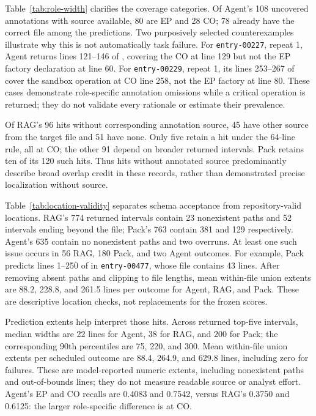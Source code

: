 


Table~\ref{tab:role-width} clarifies the coverage categories. Of Agent's 108 uncovered annotations with source available, 80 are EP and 28 CO; 78 already have the correct file among the predictions. Two purposively selected counterexamples illustrate why this is not automatically task failure. For \texttt{entry-00227}, repeat 1, Agent returns lines 121--146 of , covering the CO at line 129 but not the EP factory declaration at line 60. For \texttt{entry-00229}, repeat 1, its lines 253--267 of  cover the sandbox operation at CO line 258, not the EP factory at line 80. These cases demonstrate role-specific annotation omissions while a critical operation is returned; they do not validate every rationale or estimate their prevalence.

Of RAG's 96 hits without corresponding annotation source, 45 have other source from the target file and 51 have none. Only five retain a hit under the 64-line rule, all at CO; the other 91 depend on broader returned intervals. Pack retains ten of its 120 such hits. Thus hits without annotated source predominantly describe broad overlap credit in these records, rather than demonstrated precise localization without source.

Table~\ref{tab:location-validity} separates schema acceptance from repository-valid locations. RAG's 774 returned intervals contain 23 nonexistent paths and 52 intervals ending beyond the file; Pack's 763 contain 381 and 129 respectively. Agent's 635 contain no nonexistent paths and two overruns. At least one such issue occurs in 56 RAG, 180 Pack, and two Agent outcomes. For example, Pack predicts lines 1--250 of  in \texttt{entry-00477}, whose file contains 43 lines. After removing absent paths and clipping to file lengths, mean within-file union extents are 88.2, 228.8, and 261.5 lines per outcome for Agent, RAG, and Pack. These are descriptive location checks, not replacements for the frozen scores.


Prediction extents help interpret those hits. Across returned top-five intervals, median widths are 22 lines for Agent, 38 for RAG, and 200 for Pack; the corresponding 90th percentiles are 75, 220, and 300. Mean within-file union extents per scheduled outcome are 88.4, 264.9, and 629.8 lines, including zero for failures. These are model-reported numeric extents, including nonexistent paths and out-of-bounds lines; they do not measure readable source or analyst effort. Agent's EP and CO recalls are 0.4083 and 0.7542, versus RAG's 0.3750 and 0.6125: the larger role-specific difference is at CO.

